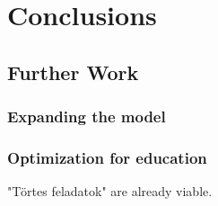 \chapter{Conclusions}

\section{Further Work}

\subsection{Expanding the model}

\subsection{Optimization for education}
"Törtes feladatok" are already viable.